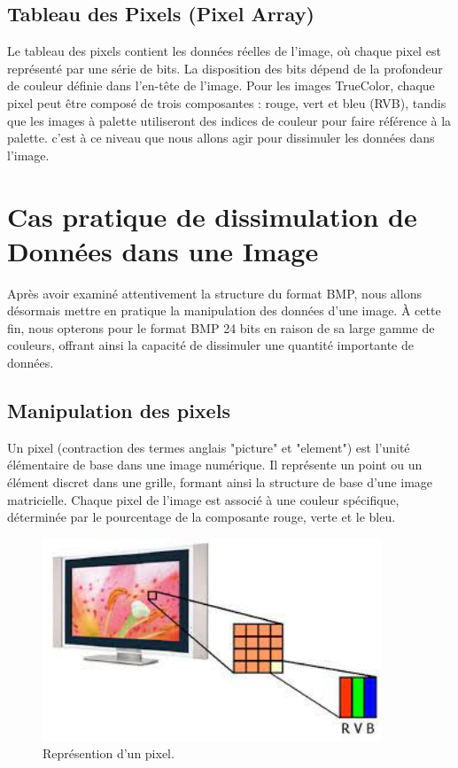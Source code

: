 \documentclass{article}
\begin{document}
\subsection{Tableau des Pixels (Pixel Array)}
Le tableau des pixels contient les données réelles de l'image, où chaque pixel est représenté par une série de bits. La disposition des bits dépend de la profondeur de couleur définie dans l'en-tête de l'image. Pour les images TrueColor, chaque pixel peut être composé de trois composantes : rouge, vert et bleu (RVB), tandis que les images à palette utiliseront des indices de couleur pour faire référence à la palette. c'est à ce niveau que nous allons agir pour dissimuler les données dans l'image.

\section{Cas pratique de dissimulation de Données dans une Image}
Après avoir examiné attentivement la structure du format BMP, nous allons désormais mettre en pratique la manipulation des données d'une image. À cette fin, nous opterons pour le format BMP 24 bits en raison de sa large gamme de couleurs, offrant ainsi la capacité de dissimuler une quantité importante de données.

\subsection{Manipulation des pixels}
Un pixel (contraction des termes anglais "picture" et "element") est l'unité élémentaire de base dans une image numérique. Il représente un point ou un élément discret dans une grille, formant ainsi la structure de base d'une image matricielle. Chaque pixel de l'image est associé à une couleur spécifique, déterminée par le pourcentage de la composante rouge, verte et le bleu.
\begin{figure}[h]
  \centering
  \includegraphics[width=0.9\textwidth]{pixel.jpeg}
  \caption{Représention d'un pixel.}
\end{figure}
\end{document}
